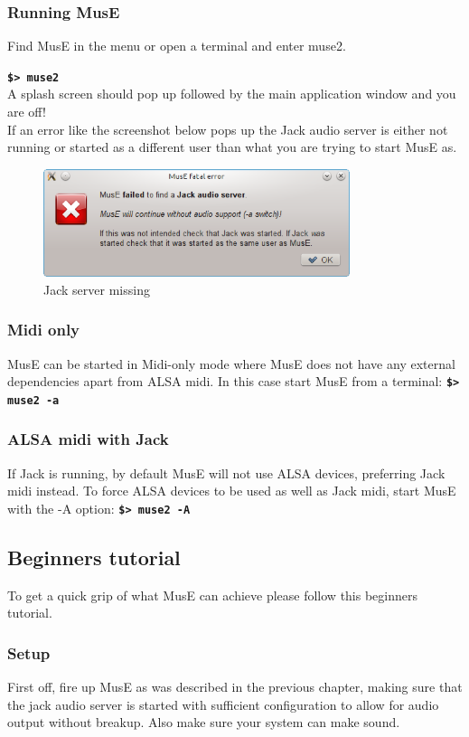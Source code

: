 \documentclass[a4paper]{report}
\newcommand{\shell}[1]{\texttt{\textbf{#1}}}
\newcommand{\screenshotwidth}[0]{0.8\textwidth}
\begin{document}
\subsubsection{Running MusE}
Find MusE in the menu or open a terminal and enter muse2.

\shell{\$> muse2}\\A splash screen should pop up followed
by the main application window and you are off!\\
If an error like the screenshot below pops up the Jack audio server is
either not running or started as a different user than what you are trying
to start MusE as.
\begin{figure}[htp]
\centering \includegraphics[width=\screenshotwidth]{pics/no_audio} 
\caption{Jack server missing}
\label{fig:no_audio} 
\end{figure}
\subsubsection{Midi only}
MusE can be started in Midi-only mode where MusE does not have any external
dependencies apart from ALSA midi. In this case start MusE from a terminal:
\shell{\$> muse2 -a}

\subsubsection{ALSA midi with Jack}
If Jack is running, by default MusE will not use ALSA devices, preferring
Jack midi instead. To force ALSA devices to be used as well as Jack
midi, start MusE with the -A option: \shell{\$> muse2 -A}

\subsection{Beginners tutorial}
To get a quick grip of what MusE can achieve please follow this beginners
tutorial.
\subsubsection{Setup}
First off, fire up MusE as was described in the previous chapter, making
sure that the jack audio server is started with sufficient configuration
to allow for audio output without breakup. Also make sure your system can
make sound. 
\end{document}
